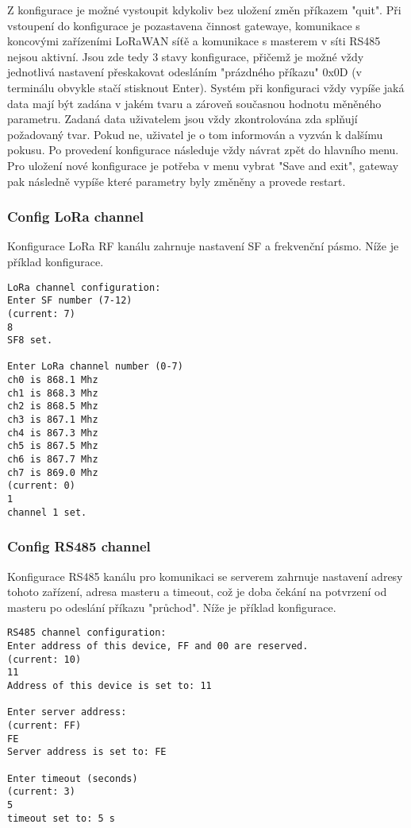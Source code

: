 Z konfigurace je možné vystoupit kdykoliv bez uložení změn příkazem "quit". 
Při vstoupení do konfigurace je pozastavena činnost gatewaye, komunikace s koncovými zařízeními LoRaWAN síťě a komunikace s masterem v síti RS485 nejsou aktivní.
Jsou zde tedy 3 stavy konfigurace, přičemž je možné vždy jednotlivá nastavení přeskakovat odesláním "prázdného příkazu" 0x0D (v terminálu obvykle stačí stisknout Enter). Systém při konfiguraci vždy vypíše jaká data mají být zadána v jakém tvaru a zároveň současnou hodnotu měněného parametru. Zadaná data uživatelem jsou vždy zkontrolována zda splňují požadovaný tvar. Pokud ne, uživatel je o tom informován a vyzván k dalšímu pokusu.
Po provedení konfigurace následuje vždy návrat zpět do hlavního menu. Pro uložení nové konfigurace je potřeba v menu vybrat "Save and exit", gateway pak následně vypíše které parametry byly změněny a provede restart.

\subsubsection{Config LoRa channel}
Konfigurace LoRa RF kanálu zahrnuje nastavení SF a frekvenční pásmo. Níže je příklad konfigurace.

\begin{lstlisting}
LoRa channel configuration:
Enter SF number (7-12)
(current: 7)
8
SF8 set.

Enter LoRa channel number (0-7)
ch0 is 868.1 Mhz
ch1 is 868.3 Mhz
ch2 is 868.5 Mhz
ch3 is 867.1 Mhz
ch4 is 867.3 Mhz
ch5 is 867.5 Mhz
ch6 is 867.7 Mhz
ch7 is 869.0 Mhz
(current: 0)
1
channel 1 set.
\end{lstlisting}

\subsubsection{Config RS485 channel}
Konfigurace RS485 kanálu pro komunikaci se serverem zahrnuje nastavení adresy tohoto zařízení, adresa masteru a timeout, což je doba čekání na potvrzení od masteru po odeslání příkazu "průchod". Níže je příklad konfigurace.

\begin{lstlisting}
RS485 channel configuration:
Enter address of this device, FF and 00 are reserved.
(current: 10)
11
Address of this device is set to: 11

Enter server address: 
(current: FF)
FE
Server address is set to: FE

Enter timeout (seconds)
(current: 3)
5
timeout set to: 5 s
\end{lstlisting}



